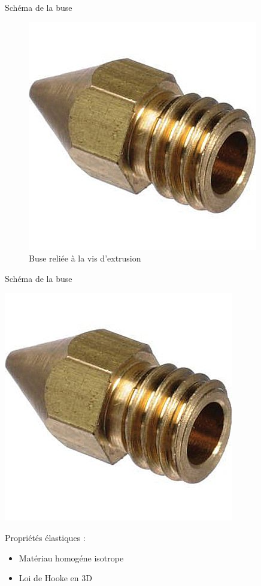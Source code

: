 \documentclass[french]{beamer}
\begin{document}
\begin{frame}{Schéma de la buse}
  \begin{center}
    \begin{figure}
      \includegraphics[scale=0.3]{images/buse.png}
      \caption{Buse reliée à la vis d'extrusion}
    \end{figure}
  \end{center}
\end{frame}

\begin{frame}{Schéma de la buse}
  \begin{minipage}{0.48\textwidth}
    \includegraphics[scale=0.3]{images/buse.png}
  \end{minipage}
  \begin{minipage}{0.48\textwidth}
    Propriétés élastiques :
    \begin{itemize}
      \item Matériau homogéne isotrope
	\pause
      \item Loi de Hooke en 3D  
    \end{itemize}
  \end{minipage}
\end{frame}
\end{document}
